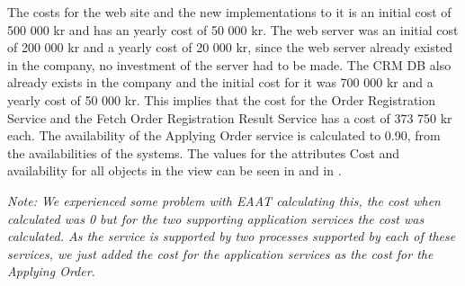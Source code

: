 The costs for the web site and the new implementations to it is an initial cost of 500 000 kr and has an yearly cost of 50 000 kr. The web server was an initial cost of 200 000 kr and a yearly cost of 20 000 kr, since the web server already existed in the company, no investment of the server had to be made. The CRM DB also already exists in the company and the initial cost for it was 700 000 kr and a yearly cost of 50 000 kr. This implies that the cost for the Order Registration Service and the Fetch Order Registration Result Service has a cost of 373 750 kr each. The availability of the Applying Order service is calculated to 0.90, from the availabilities of the systems. The values for the attributes Cost and availability for all objects in the view can be seen in  and in .

\emph{Note: We experienced some problem with EAAT calculating this, the cost when calculated was 0 but for the two supporting application services the cost was calculated. As the service is supported by two processes supported by each of these services, we just added the cost for the application services as the cost for the Applying Order.}


